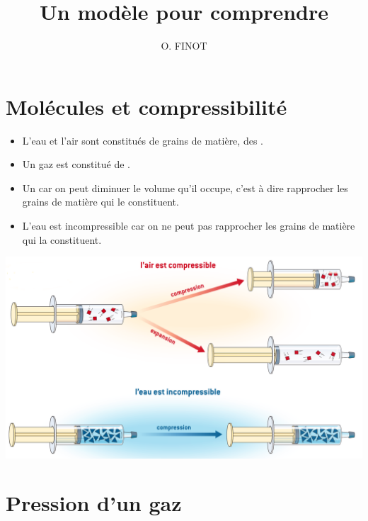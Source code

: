 \documentclass[xcolor={dvipsnames}]{beamer}
\title{Un modèle pour comprendre}
\author{O. FINOT}\institute{Collège S$^t$ Bernard}
\begin{document}
\begin{frame}
  \titlepage 
\end{frame}

\section{Molécules et compressibilité}

\begin{frame}
 

\begin{mybilan}
	\begin{itemize}
		\item L'eau et l'air sont constitués de grains de matière, des .\pause
		\item Un gaz est constitué de  .\pause
		\item Un  car on peut diminuer le volume qu'il occupe, c'est à dire rapprocher les grains de matière qui le constituent.\pause
		\item L'eau est incompressible car on ne peut pas rapprocher les grains de matière qui la constituent.
	\end{itemize}
\end{mybilan}

\end{frame}

\begin{frame}
\begin{center}
	\includegraphics[scale=0.25]{../img/compression}
\end{center}
\end{frame}


\section{Pression d'un gaz}
\end{document}
